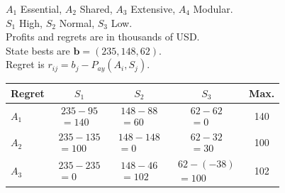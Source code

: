 {\noindent\begin{minipage}[t]{0.46\textwidth}
  \vspace{0pt}
  $A_1$ Essential, $A_2$ Shared, $A_3$ Extensive, $A_4$ Modular.\\
  $S_1$ High, $S_2$ Normal, $S_3$ Low.\\
  Profits and regrets are in thousands of USD.\\
  State bests are $\boldsymbol{b}=(235,148,62)$.\\
  Regret is $r_{ij}=b_j-P_{ay}(A_i,S_j)$.
\end{minipage}\hfill
\begin{minipage}[t]{0.51\textwidth}
  \vspace{0pt}\centering
  \setlength{\tabcolsep}{3pt}
  \renewcommand{\arraystretch}{1.2}
  \begin{tabular}{@{}lcccc@{}}
    \toprule
    Regret & $S_1$ & $S_2$ & $S_3$ & Max.\\ \midrule
    $A_1$ & $\begin{gathered}235-95\\=140\end{gathered}$ & $\begin{gathered}148-88\\=60\end{gathered}$ & $\begin{gathered}62-62\\=0\end{gathered}$ & 140\\
    $A_2$ & $\begin{gathered}235-135\\=100\end{gathered}$ & $\begin{gathered}148-148\\=0\end{gathered}$ & $\begin{gathered}62-32\\=30\end{gathered}$ & 100\\
    $A_3$ & $\begin{gathered}235-235\\=0\end{gathered}$ & $\begin{gathered}148-46\\=102\end{gathered}$ & $\begin{gathered}62-(-38)\\=100\end{gathered}$ & 102\\

\end{tabular}
\end{minipage}}
